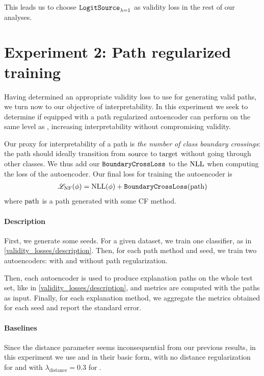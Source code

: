 \documentclass[../main.tex]{subfiles}
\begin{document}
This leads us to choose $\mathtt{LogitSource}_{\lambda=1}$ as validity loss in the rest of our analyses.

\section{Experiment 2: Path regularized training}
\label{exp/path_reg}

Having determined an appropriate validity loss to use for generating valid paths, we turn now to our objective of interpretability.
In this experiment we seek to determine if \ls{} equipped with a path regularized autoencoder can perform on the same level as \revise{}, increasing interpretability without compromising validity.

Our proxy for interpretability of a path is \emph{the number of class boundary crossings}:
the path should ideally transition from $\mathrm{source}$ to $\mathrm{target}$ without going through other classes.
We thus add our $\mathtt{BoundaryCrossLoss}$ to the $\text{NLL}$ when computing the loss of the autoencoder.
Our final loss for training the autoencoder is
\begin{align*}
    \mathscr{L}_\text{NF}(\phi) = \text{NLL}(\phi) + \mathtt{BoundaryCrossLoss}(\mathrm{path})
\end{align*}
where $\mathrm{path}$ is a path generated with some CF method.


\paragraph{Description}

First, we generate some seeds.
For a given dataset, we train one classifier, as in \autoref{validity_losses/description}.
Then, for each path method and seed, we train two autoencoders: with and without path regularization.

Then, each autoencoder is used to produce explanation paths on the whole test set, like in \autoref{validity_losses/description}, and metrics are computed with the paths as input.
Finally, for each explanation method, we aggregate the metrics obtained for each seed and report the standard error.


\paragraph{Baselines}
\label{exp/path_reg/baselines}

Since the distance parameter seems inconsequential from our previous results,
in this experiment we use \ls{} and \revise{} in their basic form, \ie{} with no distance regularization for \ls{} and with $\lambda_\text{distance} = 0.3$ for \revise.
\end{document}
